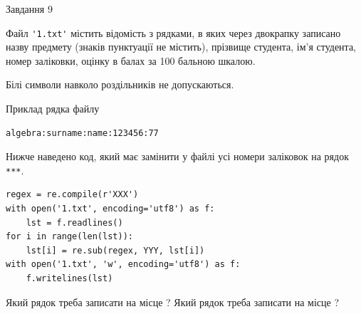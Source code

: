 \documentclass[12pt, ukrainian]{article}
\def\code#1{\Verb!#1!}
\begin{document}
{\begin{minipage}[t]{8.0cm}
\end{minipage}

               
{\begin{center}Завдання {9}\end{center}}
\vspace{-4mm}
Файл \code{'1.txt'} містить відомість з рядками, в яких через двокрапку записа\-но назву предмету (знаків пунктуації не містить), прізвище студента, ім'я студента, номер залі\-ков\-ки, оцінку в балах за 100 бальною шкалою.

Білі символи навколо роздільників не допускаються.

Приклад рядка файлу



\begin{verbatim}
algebra:surname:name:123456:77
\end{verbatim}


Нижче наведено код, який має замінити у файлі усі номери заліковок на рядок \code{***}.



\begin{verbatim}
regex = re.compile(r'XXX')
with open('1.txt', encoding='utf8') as f:
    lst = f.readlines()
for i in range(len(lst)):
    lst[i] = re.sub(regex, YYY, lst[i])
with open('1.txt', 'w', encoding='utf8') as f:
    f.writelines(lst)
\end{verbatim}





Який рядок треба записати на місце  ?
Який рядок треба записати на місце  ?\par

}
\end{document}
